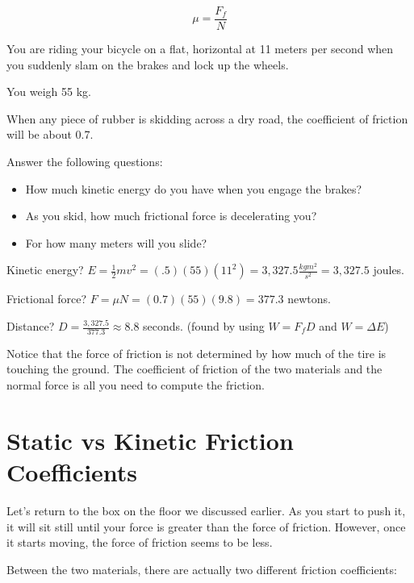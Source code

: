 $$\mu = \frac{F_{f}}{N}$$

\begin{Exercise}[title={Bicycle Stopping}, label=bike_stop]
 
You are riding your bicycle on a flat, horizontal at 11 meters per second when you suddenly slam on the brakes and lock up the wheels. 

You weigh 55 kg.  

When any piece of rubber is skidding across a dry road, the coefficient of friction will be about 0.7.

Answer the following questions: 

\begin{itemize}
\item How much kinetic energy do you have when you engage the brakes?
\item As you skid, how much frictional force is decelerating you?
\item For how many meters will you slide?
\end{itemize}

\end{Exercise}
\begin{Answer}[ref=bike_stop]

Kinetic energy? $E = \frac{1}{2}mv^2 = (.5)(55)(11^2) = 3,327.5 \frac{kg m^2}{s^2} = 3,327.5$ joules.

Frictional force? $F = \mu N = (0.7)(55)(9.8) = 377.3$ newtons.

Distance? $D = \frac{3,327.5}{377.3} \approx 8.8$ seconds. (found by using $W = F_f D$ and $W = \Delta E$)

\end{Answer}

Notice that the force of friction is not determined by how much of the tire is touching the ground. The coefficient of friction of the two materials and the normal force is all you need to compute the friction.
\section{Static vs Kinetic Friction Coefficients}

Let's return to the box on the floor we discussed earlier. As you start to push it, it will sit still until your force is greater than the force of friction.  However, once it starts moving, the force of friction seems to be less.

Between the two materials, there are actually two different friction coefficients:

